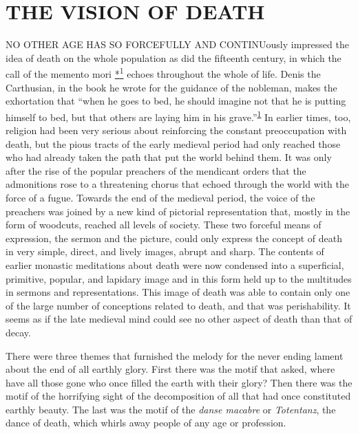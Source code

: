 \chapter{THE VISION OF DEATH}

NO OTHER AGE HAS SO FORCEFULLY AND CONTINUously impressed the idea of
death on the whole population as did the fifteenth century, in which the
call of the memento mori
\protect\hypertarget{12_Chapter_Five__THE_VISION_OF_DEAT.xhtmlux5cux23id_2952}{\protect\hyperlink{23_NOTES.xhtmlux5cux23id_2951}{*\textsuperscript{1}}}
echoes throughout the whole of life. Denis the Carthusian, in the book
he wrote for the guidance of the nobleman, makes the exhortation that
``when he goes to bed, he should imagine not that he is putting himself
to bed, but that others are laying him in his
grave.''\textsuperscript{\protect\hypertarget{12_Chapter_Five__THE_VISION_OF_DEAT.xhtmlux5cux23id_1349}{\protect\hyperlink{23_NOTES.xhtmlux5cux23id_1350}{1}}}
In earlier times, too, religion had been very serious about reinforcing
the constant preoccupation with death, but the pious tracts of the early
medieval period had only reached those who had already taken the path
that put the world behind them. It was only after the rise of the
popular preachers of the mendicant orders that the admonitions rose to a
threatening chorus that echoed through the world with the force of a
fugue. Towards the end of the medieval period, the voice of the
preachers was joined by a new kind of pictorial representation that,
mostly in the form of woodcuts, reached all levels of society. These two
forceful means of expression, the sermon and the picture, could only
express the concept of death in very simple, direct, and lively images,
abrupt and sharp. The contents of earlier monastic meditations about
death were now condensed into a superficial, primitive, popular, and
lapidary image and in this form held up to the multitudes in sermons and
representations. This image of death was able to contain only one of the
large number of conceptions related to death, and that was
perishability. It seems as if the late medieval mind could see no other
aspect of death than that of decay.

There were three themes that furnished the melody for the never ending
lament about the end of all earthly glory. First there was the
\protect\hypertarget{12_Chapter_Five__THE_VISION_OF_DEAT.xhtmlux5cux23page_157}{}{}motif
that asked, where have all those gone who once filled the earth with
their glory? Then there was the motif of the horrifying sight of the
decomposition of all that had once constituted earthly beauty. The last
was the motif of the \emph{danse macabre} or \emph{Totentanz}, the dance
of death, which whirls away people of any age or profession.

